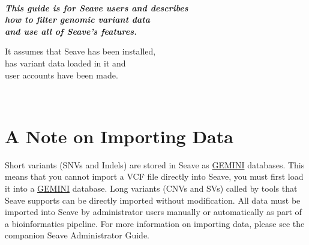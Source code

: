 \documentclass[11pt, a4paper]{article}
\newcommand{\GEMINI}{\href{https://gemini.readthedocs.io}{GEMINI} } %
\begin{document}




\newpage

~
\vfill

\begin{center}
	\Large\bfseries\itshape
	This guide is for Seave users and describes\\ how to filter genomic variant data\\ and use all of Seave's features.
	
	\vspace{2\baselineskip} 

	It assumes that Seave has been installed,\\ has variant data loaded in it and\\ user accounts have been made.
\end{center}

\vfill\vfill
~

\newpage


\tableofcontents %





\newpage

\section{A Note on Importing Data}

Short variants (SNVs and Indels) are stored in Seave as \GEMINI databases. This means that you cannot import a VCF file directly into Seave, you must first load it into a \GEMINI database. Long variants (CNVs and SVs) called by tools that Seave supports can be directly imported without modification. All data must be imported into Seave by administrator users manually or automatically as part of a bioinformatics pipeline. For more information on importing data, please see the companion Seave Administrator Guide.
\end{document}
